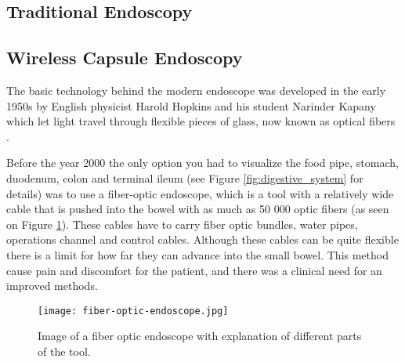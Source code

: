 \documentclass[thesis.tex]{subfiles}
\begin{document}


\subsection{Traditional Endoscopy}


\subsection{Wireless Capsule Endoscopy}  \label{sec:wireless_capsule_endoscopy}
The basic technology behind the modern endoscope was developed in the early 1950s by English physicist Harold Hopkins and his student Narinder Kapany which let light travel through flexible pieces of glass, now known as optical fibers \cite{NewMethod54}.

Before the year 2000 the only option you had to visualize the food pipe, stomach, duodenum, colon and terminal ileum (see Figure \ref{fig:digestive_system} for details) was to use a fiber-optic endoscope, which is a tool with a relatively wide cable that is pushed into the bowel with as much as 50 000 optic fibers (as seen on Figure \ref{fig:fiber-optic-endoscopy}). These cables have to carry fiber optic bundles, water pipes, operations channel and control cables. Although these cables can be quite flexible there is a limit for how far they can advance into the small bowel. This method cause pain and discomfort for the patient, and there was a clinical need for an improved methods.

\begin{figure} %
  \begin{center}
    \texttt{[image: fiber-optic-endoscope.jpg]}
    \caption[Image of a fiber optic endoscope with explanation of different parts of the tool]{Image of a fiber optic endoscope with explanation of different parts of the tool\footnotemark.}
    \label{fig:fiber-optic-endoscopy}
  \end{center}
\end{figure}

\end{document}
